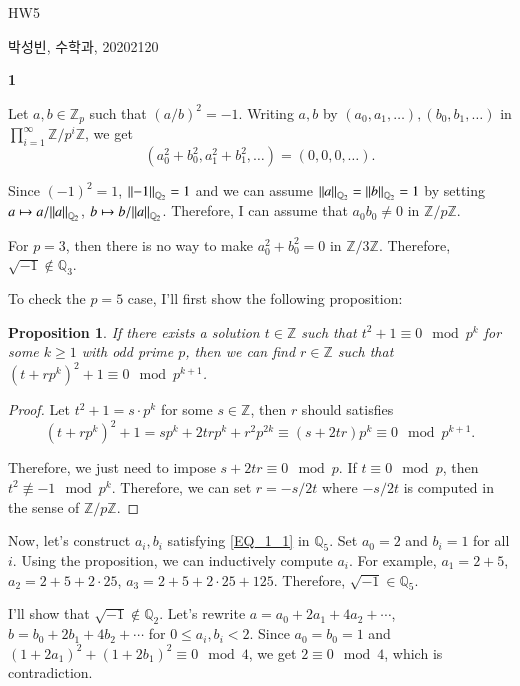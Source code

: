 \documentclass[a4paper, 12pt]{article}
\theoremstyle{Mydefinition}
\theoremstyle{Mytheorem}
\newtheorem{proposition}[statement]{Proposition}
\newcommand{\quotZ}[1]{\ensuremath{\mathbb{Z}/p^{#1}\mathbb{Z}}}
\begin{document}
\thispagestyle{myfirstpage}
\begin{center}
	\Large{HW5}
\end{center}
박성빈, 수학과, 20202120

\noindent \textbf{1}

Let $a,b\in \mathbb{Z}_p$ such that $(a/b)^2 = -1$. Writing $a,b$ by $(a_0, a_1, \ldots), (b_0,b_1,\ldots)$ in $\prod_{i=1}^\infty \quotZ{i}$, we get
\begin{equation}\label{EQ_1_1}
    (a_0^2+b_0^2, a_1^2 + b_1^2, \ldots) = (0,0,0,\ldots).
\end{equation}

Since $(-1)^2 = 1$, $\norm{-1}_{\mathbb{Q}_2} = 1$ and we can assume $\norm{a}_{\mathbb{Q}_2} = \norm{b}_{\mathbb{Q}_2} = 1$ by setting $a \mapsto a/\norm{a}_{\mathbb{Q}_2}$, $b\mapsto b/\norm{a}_{\mathbb{Q}_2}$. Therefore, I can assume that $a_0b_0\neq 0$ in $\mathbb{Z}/p\mathbb{Z}$.

For $p=3$, then there is no way to make $a_0^2+b_0^2 = 0$ in $\mathbb{Z}/3\mathbb{Z}$. Therefore, $\sqrt{-1}\not\in\mathbb{Q}_3$.

To check the $p=5$ case, I'll first show the following proposition:
\begin{proposition}
If there exists a solution $t\in\mathbb{Z}$ such that $t^2+1\equiv 0\mod p^k$ for some $k\geq 1$ with odd prime $p$, then we can find $r\in\mathbb{Z}$ such that $(t+rp^k)^2+1\equiv 0\mod p^{k+1}$.
\end{proposition}
\begin{proof}
Let $t^2+1 = s\cdot p^k$ for some $s\in \mathbb{Z}$, then $r$ should satisfies
\begin{equation}
    (t+rp^k)^2+1 = sp^k + 2trp^k + r^2p^{2k}\equiv (s+2tr)p^k \equiv 0 \mod p^{k+1}.
\end{equation}

Therefore, we just need to impose $s+2tr \equiv 0 \mod p$. If $t\equiv 0\mod p$, then $t^2\not\equiv -1\mod p^k$. Therefore, we can set $r = -s/2t$ where $-s/2t$ is computed in the sense of $\mathbb{Z}/p\mathbb{Z}$.
\end{proof}

Now, let's construct $a_i, b_i$ satisfying \eqref{EQ_1_1} in $\mathbb{Q}_5$. Set $a_0=2$ and $b_i=1$ for all $i$. Using the proposition, we can inductively compute $a_i$. For example, $a_1 = 2+5$, $a_2 = 2+5+2\cdot 25$, $a_3 = 2+5+2\cdot 25 + 125$. Therefore, $\sqrt{-1}\in \mathbb{Q}_5$.

I'll show that $\sqrt{-1}\not\in \mathbb{Q}_2$. Let's rewrite $a = a_0+2a_1+4a_2+\cdots$, $b = b_0+2b_1+4b_2+\cdots$ for $0\leq a_i,b_i<2$. Since $a_0=b_0=1$ and $(1+2a_1)^2+(1+2b_1)^2 \equiv 0 \mod 4$, we get $2\equiv 0\mod 4$, which is contradiction.\\
\end{document}
